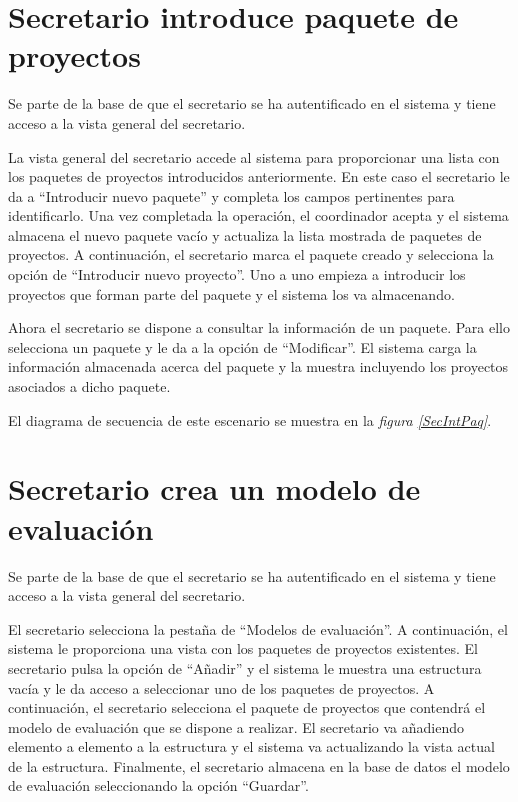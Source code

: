 \documentclass[11pt,a4paper,spanish,twoside]{book}
\begin{document}
\section{Secretario introduce paquete de proyectos}
Se parte de la base de que el secretario se ha autentificado en el sistema y
tiene acceso a la vista general del secretario.

La vista general del secretario accede al sistema para proporcionar una
lista con los paquetes de proyectos introducidos anteriormente. En este caso
el secretario le da a ``Introducir nuevo paquete'' y completa los campos
pertinentes para identificarlo. Una vez completada la operación, el
coordinador acepta y el sistema almacena el nuevo paquete vacío y actualiza
la lista mostrada de paquetes de proyectos. A continuación, el secretario
marca el paquete creado y selecciona la opción de ``Introducir nuevo 
proyecto''. Uno a uno empieza a introducir los proyectos que forman parte del
paquete y el sistema los va almacenando.

Ahora el secretario se dispone a consultar la información de un paquete.
Para ello selecciona un paquete y le da a la opción de ``Modificar''. El
sistema carga la información almacenada acerca del paquete y la muestra
incluyendo los proyectos asociados a dicho paquete.

El diagrama de secuencia de este escenario se muestra en la \emph{figura
\ref{SecIntPaq}}.


\section{Secretario crea un modelo de evaluación}
Se parte de la base de que el secretario se ha autentificado en el sistema y
tiene acceso a la vista general del secretario.

El secretario selecciona la pestaña de ``Modelos de evaluación''. A
continuación, el sistema le proporciona una vista con los paquetes de
proyectos existentes. El secretario pulsa la opción de ``Añadir'' y el sistema
le muestra una estructura vacía y le da acceso a seleccionar uno de los
paquetes de proyectos. A continuación, el secretario selecciona el paquete de
proyectos que contendrá el modelo de evaluación que se dispone a realizar.
El secretario va añadiendo elemento a elemento a la estructura y el sistema
va actualizando la vista actual de la estructura. Finalmente, el secretario
almacena en la base de datos el modelo de evaluación seleccionando la opción
``Guardar''.
\end{document}
